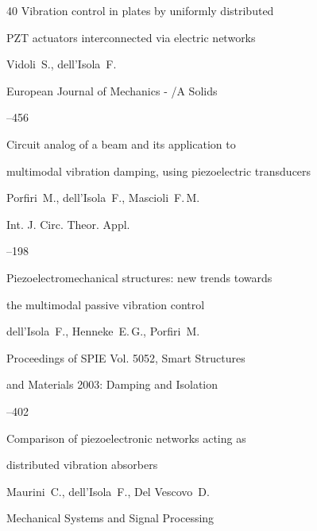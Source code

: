 \begin{thebibliography}{40}
\paper Vibration control in plates by uniformly distributed

PZT actuators interconnected via electric networks

\by Vidoli~S., dell'Isola~F.

\jour European Journal of Mechanics - /A Solids




--456





\paper Circuit analog of a beam and its application to

multimodal vibration damping, using piezoelectric transducers

\by Porfiri~M., dell'Isola~F., Mascioli~F.\,M.

\jour Int. J. Circ. Theor. Appl.




--198





\paper Piezoelectromechanical structures: new trends towards

the multimodal passive vibration control

\by dell'Isola~F., Henneke~E.\,G., Porfiri~M.

\jour Proceedings of SPIE Vol. 5052, Smart Structures

and Materials 2003: Damping and Isolation


--402





\paper Comparison of piezoelectronic networks acting as

distributed vibration absorbers

\by Maurini~C., dell'Isola~F., Del Vescovo~D.

\jour Mechanical Systems and Signal Processing



\end{thebibliography}
